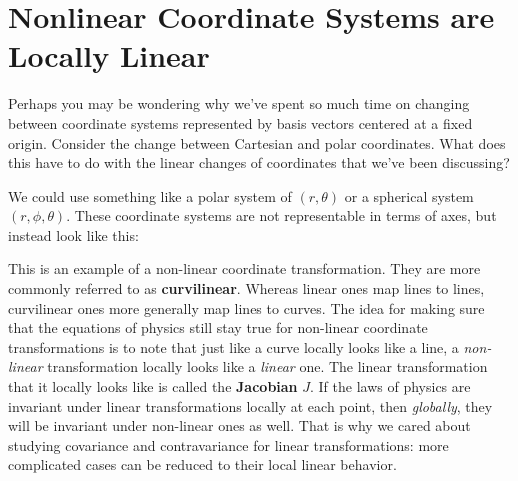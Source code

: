 \documentclass[../master.tex]{subfiles}
\begin{document}
	


	\section[Nonlinear Coordinate Systems are Locally Linear]{Nonlinear Coordinate Systems are\\ Locally Linear}%
	\label{sec:nonlinear_coordinate_systems_are_locally_linear}
	
	Perhaps you may be wondering why we've spent so much time on changing between coordinate systems represented by basis vectors centered at a fixed origin. Consider the change between Cartesian and polar coordinates. What does this have to do with the linear changes of coordinates that we've been discussing?
	
	We could use something like a polar system of $(r,\theta)$ or a spherical system $(r, \phi, \theta)$. These coordinate systems are not representable in terms of axes, but instead look like this:
	
	
	This is an example of a non-linear coordinate transformation. They are more commonly referred to as \textbf{curvilinear}. Whereas linear ones map lines to lines, curvilinear ones more generally map lines to curves. The idea for making sure that the equations of physics still stay true for non-linear coordinate transformations is to note that just like a curve locally looks like a line, a \emph{non-linear} transformation locally looks like a \emph{linear} one. The linear transformation that it locally looks like is called the \textbf{Jacobian}  $J$. If the laws of physics are invariant under linear transformations locally at each point, then \emph{globally}, they will be invariant under non-linear ones as well. That is why we cared about studying covariance and contravariance for linear transformations: more complicated cases can be reduced to their local linear behavior.
	
\end{document}
